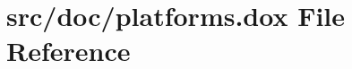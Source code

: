 \hypertarget{platforms_8dox}{\section{src/doc/platforms.dox File Reference}
\label{platforms_8dox}
}
